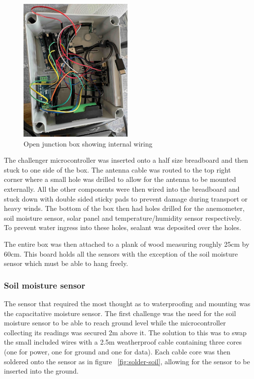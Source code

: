 \begin{figure}[H]
    \centering
    \includegraphics[width=0.5\textwidth]{contents/part-2/fig2/box-internals.jpeg}
    \caption{Open junction box showing internal wiring}
    \label{fig:box-internals}
\end{figure}

The challenger microcontroller was inserted onto a half size breadboard and then
stuck to one side of the box. The antenna cable was routed to the top right
corner where a small hole was drilled to allow for the antenna to be mounted
externally. All the other components were then wired into the breadboard and
stuck down with double sided sticky pads to prevent damage during transport or
heavy winds. The bottom of the box then had holes drilled for the anemometer,
soil moisture sensor, solar panel and temperature/humidity sensor respectively.
To prevent water ingress into these holes, sealant was deposited over the holes.

The entire box was then attached to a plank of wood measuring roughly 25cm by
60cm. This board holds all the sensors with the exception of the soil moisture
sensor which must be able to hang freely.

\subsubsection{Soil moisture sensor}

The sensor that required the most thought as to waterproofing and mounting was
the capacitative moisture sensor. The first challenge was the need for the soil
moisture sensor to be able to reach ground level while the microcontroller
collecting its readings was secured 2m above it. The solution to this was to
swap the small included wires with a 2.5m weatherproof cable containing three
cores (one for power, one for ground and one for data). Each cable core was then
soldered onto the sensor as in figure ~\ref{fig:solder-soil}, allowing for the
sensor to be inserted into the ground.

